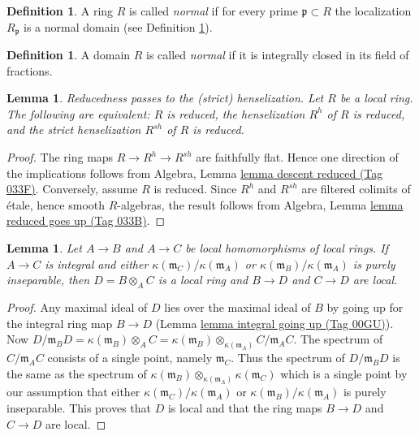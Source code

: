 \documentclass{amsart}
\newenvironment{slogan}{\comment}{\endcomment}
\theoremstyle{plain}
\newtheorem{lemma}[subsection]{Lemma}
\theoremstyle{definition}
\newtheorem{definition}[subsection]{Definition}
\theoremstyle{remark}
\numberwithin{equation}{subsection}
\begin{document}
\begin{definition}
\label{algebra-definition-ring-normal}
A ring $R$ is called {\it normal} if for every prime
$\mathfrak p \subset R$ the localization $R_{\mathfrak p}$ is
a normal domain (see Definition \ref{algebra-definition-domain-normal}).
\end{definition}

\begin{definition}
\label{algebra-definition-domain-normal}
A domain $R$ is called {\it normal} if it is integrally
closed in its field of fractions.
\end{definition}

\begin{lemma}
\label{lemma-henselization-reduced}
\begin{slogan}
Reducedness passes to the (strict) henselization.
\end{slogan}
Let $R$ be a local ring.
The following are equivalent: $R$ is reduced,
the henselization $R^h$ of $R$ is reduced, and
the strict henselization $R^{sh}$ of $R$ is reduced.
\end{lemma}

\begin{proof}
The ring maps $R \to R^h \to R^{sh}$ are faithfully flat.
Hence one direction of the implications follows from
Algebra, Lemma \href{https://stacks.math.columbia.edu/tag/033F}{lemma descent reduced (Tag 033F)}.
Conversely, assume $R$ is reduced. Since $R^h$ and $R^{sh}$
are filtered colimits of \'etale, hence smooth $R$-algebras, the
result follows from
Algebra, Lemma \href{https://stacks.math.columbia.edu/tag/033B}{lemma reduced goes up (Tag 033B)}.
\end{proof}


\begin{lemma}
\label{algebra-lemma-local-tensor-with-integral}
Let $A \to B$ and $A \to C$ be local homomorphisms of local rings.
If $A \to C$ is integral and either
$\kappa(\mathfrak m_C)/\kappa(\mathfrak m_A)$ or
$\kappa(\mathfrak m_B)/\kappa(\mathfrak m_A)$ is purely
inseparable, then $D = B \otimes_A C$ is a local ring and
$B \to D$ and $C \to D$ are local.
\end{lemma}

\begin{proof}
Any maximal ideal of $D$ lies over the maximal ideal of $B$ by
going up for the integral ring map
$B \to D$ (Lemma \href{https://stacks.math.columbia.edu/tag/00GU}{lemma integral going up (Tag 00GU)}).
Now $D/\mathfrak m_B D = \kappa(\mathfrak m_B) \otimes_A C =
\kappa(\mathfrak m_B) \otimes_{\kappa(\mathfrak m_A)} C/\mathfrak m_A C$.
The spectrum of $C/\mathfrak m_A C$ consists of a
single point, namely $\mathfrak m_C$. Thus the spectrum of
$D/\mathfrak m_B D$ is the same as the spectrum of
$\kappa(\mathfrak m_B) \otimes_{\kappa(\mathfrak m_A)} \kappa(\mathfrak m_C)$
which is a single point by our assumption that either
$\kappa(\mathfrak m_C)/\kappa(\mathfrak m_A)$ or
$\kappa(\mathfrak m_B)/\kappa(\mathfrak m_A)$ is purely
inseparable. This proves that $D$ is local and that the ring maps
$B \to D$ and $C \to D$ are local.
\end{proof}
\end{document}
